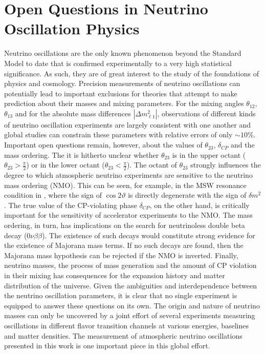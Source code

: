 \section{Open Questions in Neutrino Oscillation Physics}
Neutrino oscillations are the only known phenomenon beyond the Standard Model to date that is confirmed experimentally to a very high statistical significance.
As such, they are of great interest to the study of the foundations of physics and cosmology.
Precision measurements of neutrino oscillations can potentially lead to important exclusions for theories that attempt to make prediction about their masses and mixing parameters.
For the mixing angles $\theta_{12}$, $\theta_{13}$ and for the absolute mass differences $|\Delta m^2_{\ell 1}|$, observations of different kinds of neutrino oscillation experiments are largely consistent with one another and global studies can constrain these parameters with relative errors of only $\sim{10\%}$\cite{Esteban:2020cvm}.
Important open questions remain, however, about the values of $\theta_{23}$, $\delta_{CP}$ and the mass ordering.
The it is hitherto unclear whether $\theta_{23}$ is in the upper octant ($\theta_{23} > \frac{\pi}{2}$) or in the lower octant ($\theta_{23} < \frac{\pi}{2}$).
The octant of $\theta_{23}$ strongly influences the degree to which atmospheric neutrino experiments are sensitive to the neutrino mass ordering (NMO).
This can be seen, for example, in the MSW resonance condition in , where the sign of $\cos{2\vartheta}$ is directly degenerate with the sign of $\delta m^2$.
The true value of the CP-violating phase $\delta_{CP}$, on the other hand, is critically important for the sensitivity of accelerator experiments to the NMO.
The mass ordering, in turn, has implications on the search for neutrinoless double beta decay ($0\nu\beta\beta$).
The existence of such decays would constitute strong evidence for the existence of Majorana mass terms.
If no such decays are found, then the Majorana mass hypothesis can be rejected if the NMO is inverted.
Finally, neutrino masses, the process of mass generation and the amount of CP violation in their mixing has consequences for the expansion history and matter distribution of the universe.
Given the ambiguities and interdependence between the neutrino oscillation parameters, it is clear that no single experiment is equipped to answer these questions on its own.
The origin and nature of neutrino masses can only be uncovered by a joint effort of several experiments measuring oscillations in different flavor transition channels at various energies, baselines and matter densities.
The measurement of atmospheric neutrino oscillations presented in this work is one important piece in this global effort.
